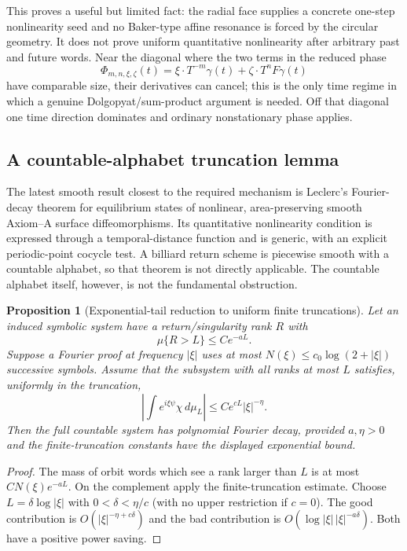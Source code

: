 \documentclass[11pt]{article}
\newtheorem{proposition}[theorem]{Proposition}
\begin{document}
This proves a useful but limited fact: the radial face supplies a concrete
one-step nonlinearity seed and no Baker-type affine resonance is forced by
the circular geometry.  It does not prove uniform quantitative nonlinearity
after arbitrary past and future words.  Near the diagonal where the two
terms in the reduced phase
\begin{equation}
\label{eq:phase}
 \Phi_{m,n,\xi,\zeta}(t)
 =\xi\cdot T^{-m}\gamma(t)+\zeta\cdot T^nF\gamma(t)
\end{equation}
have comparable size, their derivatives can cancel;
this is the only time regime in which a genuine Dolgopyat/sum-product
argument is needed.  Off that diagonal one time direction dominates and
ordinary nonstationary phase applies.

\subsection{A countable-alphabet truncation lemma}

The latest smooth result closest to the required mechanism is Leclerc's
Fourier-decay theorem for equilibrium states of nonlinear, area-preserving
smooth Axiom--A surface diffeomorphisms.  Its quantitative nonlinearity
condition is expressed through a temporal-distance function and is generic,
with an explicit periodic-point cocycle test.  A billiard return scheme is
piecewise smooth with a countable alphabet, so that theorem is not directly
applicable.  The countable alphabet itself, however, is not the fundamental
obstruction.

\begin{proposition}[Exponential-tail reduction to uniform finite truncations]
\label{prop:countable-truncation}
Let an induced symbolic system have a return/singularity rank $R$ with
\[
 \mu\{R>L\}\le C e^{-aL}.
\]
Suppose a Fourier proof at frequency $|\xi|$ uses at most
$N(\xi)\le c_0\log(2+|\xi|)$ successive symbols.  Assume that the subsystem
with all ranks at most $L$ satisfies, uniformly in the truncation,
\[
 \left|\int e^{i\xi\psi}\chi\,d\mu_L\right|
 \le C e^{cL}|\xi|^{-\eta}.
\]
Then the full countable system has polynomial Fourier decay, provided
$a,\eta>0$ and the finite-truncation constants have the displayed
exponential bound.
\end{proposition}

\begin{proof}
The mass of orbit words which see a rank larger than $L$ is at most
$C N(\xi)e^{-aL}$.  On the complement apply the finite-truncation estimate.
Choose $L=\delta\log|\xi|$ with $0<\delta<\eta/c$ (with no upper restriction
if $c=0$).  The good contribution is
$O(|\xi|^{-\eta+c\delta})$ and the bad contribution is
$O(\log|\xi|\,|\xi|^{-a\delta})$.  Both have a positive power saving.
\end{proof}
\end{document}
